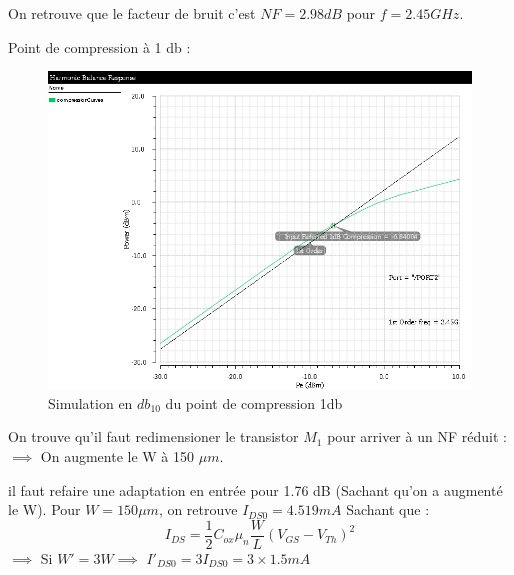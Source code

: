 \documentclass[a4paper]{article}
\begin{document}
On retrouve que le facteur de bruit c'est $NF= 2.98 dB$ pour $f=2.45GHz$.



Point de compression \`a 1 db :

\begin{figure}[!htb]
\begin{center}
  \includegraphics[scale=0.45]{Q6-1dB_Compression.png}
  \caption{Simulation en $db_{10}$ du point de compression 1db}
  \label{facteur-bruit}
\end{center}
\end{figure}

On trouve qu'il faut redimensioner le transistor $M_{1}$ pour arriver \`a un NF r\'eduit :
 $\implies$ On augmente le W \`a 150 $\mu m$.

il faut refaire une adaptation en entr\'ee pour  1.76 dB (Sachant qu'on a augment\'e le W).
Pour $W = 150 \mu m$, on retrouve $I_{DS0} = 4.519 mA$
Sachant que :
\[
  I_{DS} = \frac{1}{2}{C_{ox}}{\mu_n} \frac{W}{L}(V_{GS} - V_{Th})^2
\]
$\implies$ Si $W' = 3W \implies$ $I'_{DS0} = 3I_{DS0} = 3 \times 1.5 mA$

\clearpage
\end{document}
